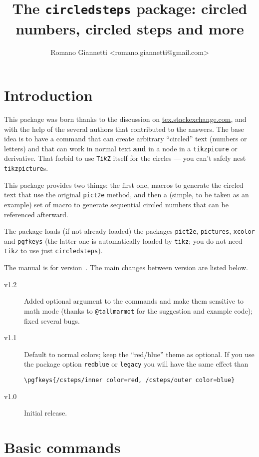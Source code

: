 \documentclass{ltxdoc}
\title{The \texttt{circledsteps} package: circled numbers, circled steps and more}
\author{Romano Giannetti <romano.giannetti@gmail.com>}
\begin{document}
\maketitle

\section{Introduction}

This package was born thanks to the discussion on \href{https://tex.stackexchange.com/questions/7032/good-way-to-make-textcircled-numbers}{tex.stackexchange.com}, and with the help of the several authors that contributed to the answers. The base idea is to have a command that can create arbitrary ``circled'' text (numbers or letters) and that can work in normal text \textbf{and} in a node in a \texttt{tikzpicure} or derivative. That forbid to use \texttt{Ti\emph{k}Z} itself for the circles --- you can't safely nest \texttt{tikzpicture}s.

This package provides two things: the first one, macros to generate the circled text that use the original \texttt{pict2e} method, and then a (simple, to be taken as an example) set of macro to generate sequential circled numbers that can be referenced afterward.

The package loads (if not already loaded) the packages \texttt{pict2e}, \texttt{pictures}, \texttt{xcolor} and \texttt{pgfkeys} (the latter one is automatically loaded by \texttt{tikz}; you do not need \texttt{tikz} to use just \texttt{circledsteps}).

The manual is for version~\cstepsversion. The main changes between version are listed below.
\begin{description}
    \item[v1.2] Added optional argument to the commands and make them sensitive to math mode (thanks to \texttt{@tallmarmot} for the suggestion and example code); fixed several bugs.
    \item[v1.1] Default to normal colors; keep the ``red/blue'' theme as optional.
        If you use the package option \texttt{redblue} or \texttt{legacy} you will have the same effect than
        \begin{lstlisting}[]
    \pgfkeys{/csteps/inner color=red, /csteps/outer color=blue}
        \end{lstlisting}
    \item[v1.0] Initial release.
\end{description}


\section{Basic commands}
\end{document}
